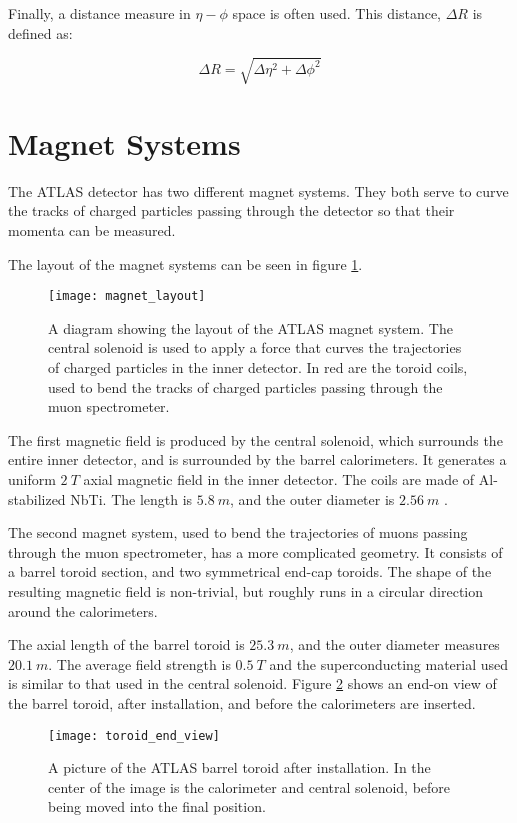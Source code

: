 Finally, a distance measure in $\eta-\phi$ space is often used. This
distance, $\Delta R$ is defined as:

\begin{equation}
\Delta R = \sqrt{\Delta\eta^2+\Delta\phi^2}
\end{equation}

\section{Magnet Systems}
The ATLAS detector has two different magnet systems. They both serve
to curve the tracks of charged particles passing through the detector
so that their momenta can be measured.

The layout of the magnet systems can be seen in figure \ref{fig:magnet_layout}.

\begin{figure}[h]
\texttt{[image: magnet\_layout]}
\caption{A diagram showing the layout of the ATLAS magnet system. The
  central solenoid is used to apply a force that curves the
  trajectories of charged particles in the inner detector. In red are
  the toroid coils, used to bend the tracks of charged particles
  passing through the muon spectrometer.}
\label{fig:magnet_layout}
\end{figure}

The first magnetic field is produced by the central solenoid, which surrounds
the entire inner detector, and is surrounded by the barrel calorimeters. It
generates a uniform $2~T$ axial magnetic field in the inner
detector. The coils are made of Al-stabilized NbTi. The length is
$5.8~m$, and the outer diameter is $2.56~m$
\cite{atlas-detector-2008}.

The second magnet system, used to bend the trajectories of muons
passing through the muon spectrometer, has a more complicated
geometry. It consists of a barrel toroid section, and two symmetrical
end-cap toroids. The shape of the resulting magnetic field is
non-trivial, but roughly runs in a circular direction around the
calorimeters.

The axial length of the barrel toroid is $25.3~m$, and the outer
diameter measures $20.1~m$. The average field strength is $0.5~T$ and the superconducting material used is similar to that used in the
central solenoid\cite{atlas-detector-2008}. Figure \ref{fig:toroid_end_view} shows an
end-on view of the barrel toroid, after installation, and before the calorimeters are
inserted.

\begin{figure}[h]
\texttt{[image: toroid\_end\_view]}
\caption{A picture of the ATLAS barrel toroid after installation. In
  the center of the image is the calorimeter and central solenoid,
  before being moved into the final position.}
\label{fig:toroid_end_view}
\end{figure}


